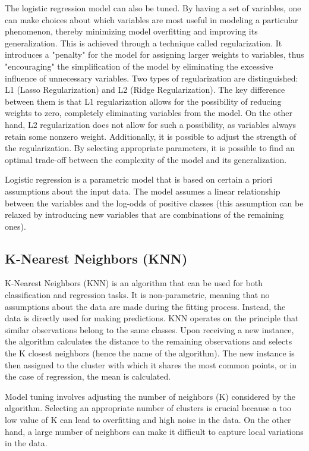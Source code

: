 The logistic regression model can also be tuned. By having a set of variables, one can make choices about which variables are most useful in modeling a particular phenomenon, thereby minimizing model overfitting and improving its generalization. This is achieved through a technique called regularization. It introduces a "penalty" for the model for assigning larger weights to variables, thus "encouraging" the simplification of the model by eliminating the excessive influence of unnecessary variables. Two types of regularization are distinguished: L1 (Lasso Regularization) and L2 (Ridge Regularization). The key difference between them is that L1 regularization allows for the possibility of reducing weights to zero, completely eliminating variables from the model. On the other hand, L2 regularization does not allow for such a possibility, as variables always retain some nonzero weight. Additionally, it is possible to adjust the strength of the regularization. By selecting appropriate parameters, it is possible to find an optimal trade-off between the complexity of the model and its generalization.

Logistic regression is a parametric model that is based on certain a priori assumptions about the input data. The model assumes a linear relationship between the variables and the log-odds of positive classes (this assumption can be relaxed by introducing new variables that are combinations of the remaining ones).

\subsection{K-Nearest Neighbors (KNN)}
K-Nearest Neighbors (KNN) is an algorithm that can be used for both classification and regression tasks. It is non-parametric, meaning that no assumptions about the data are made during the fitting process. Instead, the data is directly used for making predictions. KNN operates on the principle that similar observations belong to the same classes. Upon receiving a new instance, the algorithm calculates the distance to the remaining observations and selects the K closest neighbors (hence the name of the algorithm). The new instance is then assigned to the cluster with which it shares the most common points, or in the case of regression, the mean is calculated.

Model tuning involves adjusting the number of neighbors (K) considered by the algorithm. Selecting an appropriate number of clusters is crucial because a too low value of K can lead to overfitting and high noise in the data. On the other hand, a large number of neighbors can make it difficult to capture local variations in the data.

